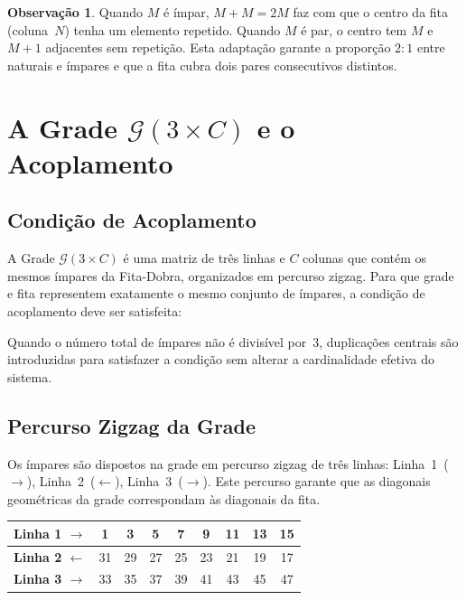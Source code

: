 \documentclass[12pt,a4paper]{article}
\theoremstyle{definition}
\newtheorem{remark}[theorem]{Observação}
\begin{document}
\begin{remark}
	Quando $M$ é ímpar, $M + M = 2M$ faz com que o centro da fita
	(coluna~$N$) tenha um elemento repetido. Quando $M$ é par, o centro tem
	$M$ e $M{+}1$ adjacentes sem repetição. Esta adaptação garante a
	proporção $2{:}1$ entre naturais e ímpares e que a fita cubra dois pares
	consecutivos distintos.
\end{remark}

\section{A Grade \texorpdfstring{$\mathcal{G}(3{\times}C)$}{G(3xC)} e o Acoplamento}
\label{sec:grade}

\subsection{Condição de Acoplamento}
\label{subsec:grade-acoplamento}

A Grade $\mathcal{G}(3{\times}C)$ é uma matriz de três linhas e $C$ colunas
que contém os mesmos ímpares da Fita-Dobra, organizados em percurso zigzag.
Para que grade e fita representem exatamente o mesmo conjunto de ímpares, a
condição de acoplamento deve ser satisfeita:

\begin{center}
\end{center}

\noindent Quando o número total de ímpares não é divisível por~3,
duplicações centrais são introduzidas para satisfazer a condição sem alterar
a cardinalidade efetiva do sistema.

\subsection{Percurso Zigzag da Grade}
\label{subsec:grade-zigzag}

Os ímpares são dispostos na grade em percurso zigzag de três linhas:
Linha~1~($\rightarrow$), Linha~2~($\leftarrow$), Linha~3~($\rightarrow$).
Este percurso garante que as diagonais geométricas da grade correspondam às
diagonais da fita.

\renewcommand{\arraystretch}{1.4}
\begin{center}
\begin{tabular}{>{\bfseries}l cccccccc}
	\toprule
	Linha 1 $\rightarrow$ & 1 & 3 & 5 & 7 & 9 & 11 & 13 & 15 \\
	\midrule
	Linha 2 $\leftarrow$  & 31 & 29 & 27 & 25 & 23 & 21 & 19 & 17 \\
	\midrule
	Linha 3 $\rightarrow$ & 33 & 35 & 37 & 39 & 41 & 43 & 45 & 47 \\
	\bottomrule
\end{tabular}
\end{center}
\end{document}
